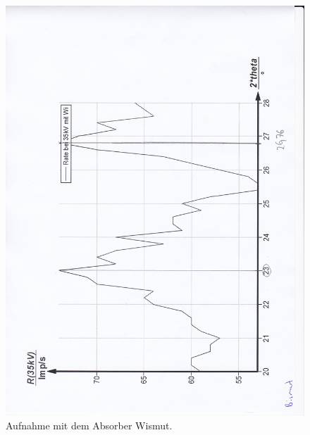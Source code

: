 \begin{figure}[p]
  \centering
  \includegraphics[width=\textwidth]{content/Bismut.jpg}
  \caption{Aufnahme mit dem Absorber Wismut.}
  \label{Bild:6}
\end{figure}
